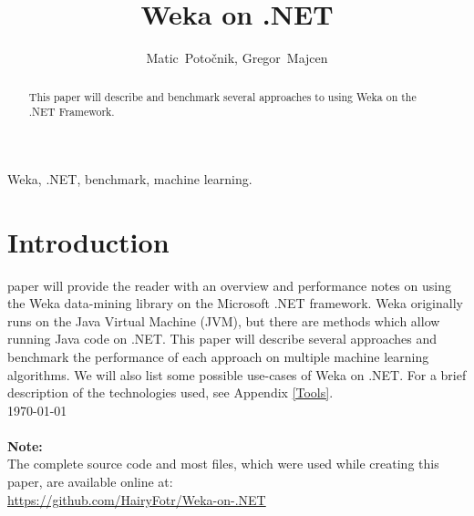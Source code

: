 \documentclass[journal]{IEEEtran/IEEEtran}
\begin{document}
\title{Weka on .NET}

\author{Matic~Potočnik, Gregor~Majcen}%


\maketitle

\begin{abstract}
This paper will describe and benchmark several approaches to using Weka on the .NET Framework.
\end{abstract}

\begin{IEEEkeywords}
Weka, .NET, benchmark, machine learning.
\end{IEEEkeywords}

\IEEEpeerreviewmaketitle

\section{Introduction}
 paper will provide the reader with an overview and performance notes on using the Weka data-mining library\cite{weka:2009} on the Microsoft .NET framework. Weka originally runs on the Java Virtual Machine (JVM), but there are methods which allow running Java code on .NET. This paper will describe several approaches and benchmark the performance of each approach on multiple machine learning algorithms. We will also list some possible use-cases of Weka on .NET. For a brief description of the technologies used, see Appendix \ref{Tools}.\\

\hfill \today
\ \\ \ \\
\textbf{Note:}\\
The complete source code and most files, which were used while creating this paper, are available online at:\\ \url{https://github.com/HairyFotr/Weka-on-.NET}\\
\end{document}
